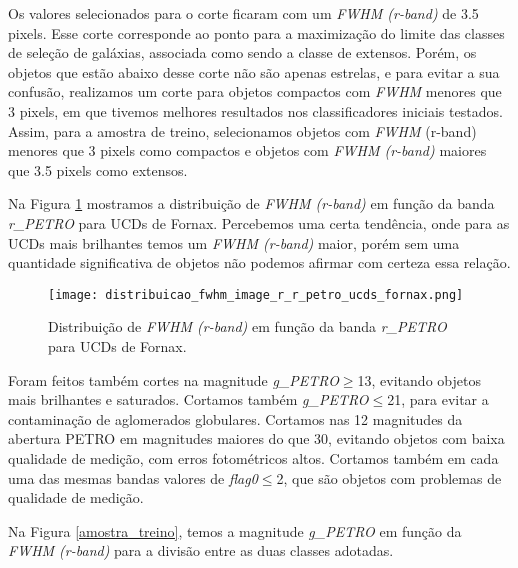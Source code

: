 \vspace{\baselineskip}

Os valores selecionados para o corte ficaram com um \textit{FWHM (r-band)} de 3.5 pixels. Esse corte corresponde ao ponto para a maximização do limite das classes de seleção de galáxias, associada como sendo a classe de extensos. Porém, os objetos que estão abaixo desse corte não são apenas estrelas, e para evitar a sua confusão, realizamos um corte para objetos compactos com \textit{FWHM} menores que 3 pixels, em que tivemos melhores resultados nos classificadores iniciais testados. Assim, para a amostra de treino, selecionamos objetos com \textit{FWHM} (r-band) menores que 3 pixels como compactos e objetos com \textit{FWHM (r-band)} maiores que 3.5 pixels como extensos.

\vspace{\baselineskip}

Na Figura \ref{distribuicao_fwhm_image_r_r_petro_ucds_fornax} mostramos a distribuição de \textit{FWHM (r-band)} em função da banda \textit{r\_PETRO} para UCDs de Fornax. Percebemos uma certa tendência, onde para as UCDs mais brilhantes temos um \textit{FWHM (r-band)} maior, porém sem uma quantidade significativa de objetos não podemos afirmar com certeza essa relação.

\begin{figure}[!ht]
    \centering
    \texttt{[image: distribuicao\_fwhm\_image\_r\_r\_petro\_ucds\_fornax.png]}
    \caption[]{Distribuição de \textit{FWHM (r-band)} em função da banda \textit{r\_PETRO} para UCDs de Fornax.}
    \label{distribuicao_fwhm_image_r_r_petro_ucds_fornax}
\end{figure}

\vspace{\baselineskip}

Foram feitos também cortes na magnitude \textit{g\_PETRO}$\geq$13, evitando objetos mais brilhantes e saturados. Cortamos também \textit{g\_PETRO}$\leq$21, para evitar a contaminação de aglomerados globulares. Cortamos nas 12 magnitudes da abertura PETRO em magnitudes maiores do que 30, evitando objetos com baixa qualidade de medição, com erros fotométricos altos. Cortamos também em cada uma das mesmas bandas valores de \textit{flag0}$\leq$2, que são objetos com problemas de qualidade de medição.

\vspace{\baselineskip}

Na Figura \ref{amostra_treino}, temos a magnitude \textit{g\_PETRO} em função da \textit{FWHM (r-band)} para a divisão entre as duas classes adotadas.

